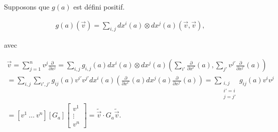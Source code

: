 \documentclass[french]{article}
\theoremstyle{definition}
\theoremstyle{remark}
\begin{document}
Supposons que \(g(a)\) est défini positif.

\begin{gather*}
  g(a)(\overrightarrow{v}) = \sum_{i,j}^{} d x ^{i}(a) \otimes d x ^{j}(a)(\overrightarrow{v}, \overrightarrow{v}),
\end{gather*}

avec

\begin{gather*}
  \overrightarrow{v} = \sum_{j=1}^{n} v ^{j} \frac{\partial  }{\partial x ^{j}} = \sum_{i,j}^{} g _{i,j}(a) d x^{i}(a) \otimes d x^{j}(a) \left(\sum_{i'}^{} \frac{\partial  }{\partial x ^{i'}}(a), \sum_{j'}^{} v ^{j'} \frac{\partial  }{\partial x ^{j'}}(a)\right) \\
  = \sum_{i,j} \sum_{i',j'} g _{ij}(a) v ^{i'} v ^{j'} d x^{i}(a) \left(\frac{\partial  }{\partial x ^{i'}}(a) d x^{j}(a) \frac{\partial  }{\partial x ^{j'}}(a) \right)=\sum_{\substack{i,j \\ i' = i \\ j=j'}} g _{ij}(a) v ^{i} v ^{j} \\
  = [v ^{1} \ \dots \ v ^{n}] [G_a] \left[\begin{matrix}
    v ^{1} \\
    \vdots \\
    v ^{n}
  \end{matrix}\right] = \tilde{\overrightarrow{v}} \cdot G_a \tilde{\overrightarrow{v}}.
\end{gather*}

\end{document}
